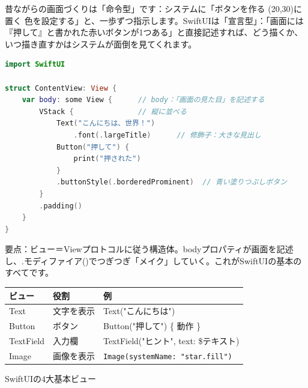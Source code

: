 


昔ながらの画面づくりは「命令型」です：システムに「ボタンを作る (20,30)に置く 色を設定する」と、一歩ずつ指示します。SwiftUIは「宣言型」：「画面には『押して』と書かれた赤いボタンが1つある」と直接記述すれば、どう描くか、いつ描き直すかはシステムが面倒を見てくれます。

\begin{lstlisting}[language=Swift]
import SwiftUI

struct ContentView: View {
    var body: some View {      // body：「画面の見た目」を記述する
        VStack {               // 縦に並べる
            Text("こんにちは、世界！")
                .font(.largeTitle)      // 修飾子：大きな見出し
            Button("押して") {
                print("押された")
            }
            .buttonStyle(.borderedProminent)  // 青い塗りつぶしボタン
        }
        .padding()
    }
}
\end{lstlisting}

要点：ビュー＝Viewプロトコルに従う構造体。bodyプロパティが画面を記述し、.モディファイア()でつぎつぎ「メイク」していく。これがSwiftUIの基本のすべてです。


\begin{center}
\begin{tabularx}{\linewidth}{|X|X|X|}
\hline
\textbf{ビュー} & \textbf{役割} & \textbf{例} \tabularnewline
\hline
Text & 文字を表示 & Text("こんにちは") \tabularnewline
Button & ボタン & Button("押して") \{ 動作 \} \tabularnewline
TextField & 入力欄 & TextField("ヒント", text: \$テキスト) \tabularnewline
Image & 画像を表示 & \texttt{Image(systemName: "star.\allowbreak fill")} \tabularnewline
\hline
\end{tabularx}
\end{center}

\begin{center}\small\color{gray}SwiftUIの4大基本ビュー\end{center}

